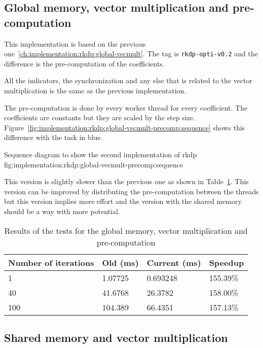 \subsection{Global memory, vector multiplication and pre-computation}
\label{ch:implementation:rkdp:global-vecmult-precomp}

This implementation is based on the previous one~\ref{ch:implementation:rkdp:global-vecmult}.
The tag is \texttt{rkdp-opti-v0.2} and the difference is the pre-computation of
the coefficients.

All the indicators, the synchronization and any else that is related to the
vector multiplication is the same as the previous implementation.

The pre-computation is done by every worker thread for every coefficient.
The coefficients are constants but they are scaled by the step size.
Figure~\ref{fig:implementation:rkdp:global-vecmult-precomp:sequence} shows
this difference with the task in blue.

{Sequence diagram to show the second implementation of \acrshort{rkdp}}
{fig:implementation:rkdp:global-vecmult-precomp:sequence}

This version is slightly slower than the previous one as shown in
Table~\ref{tab:implementation:rkdp:global-vecmult-precomp:results}.
This version can be improved by distributing the pre-computation between the
threads but this version implies more effort and the version with the shared
memory should be a way with more potential.

\begin{table}[ht]
    \centering
    \begin{tabular}{|l|l|l|l|}
        \hline
        \textbf{Number of iterations} & \textbf{Old (ms)} & \textbf{Current (ms)} & \textbf{Speedup} \\
        \hline
        1 & 1.07725 & 0.693248 & 155.39\% \\
        \hline
        40 & 41.6768 & 26.3782 & 158.00\% \\
        \hline
        100 & 104.389 & 66.4351 & 157.13\% \\
        \hline
    \end{tabular}
    \caption{Results of the tests for the global memory, vector multiplication and pre-computation}
    \label{tab:implementation:rkdp:global-vecmult-precomp:results}
\end{table}

\subsection{Shared memory and vector multiplication}
\label{ch:implementation:rkdp:shared-vecmult}

